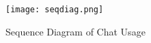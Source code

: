 \begin{figure}
\centering
\texttt{[image: seqdiag.png]}
\caption{Sequence Diagram of Chat Usage}
\label{fig:seq_diag}
\end{figure}



%


%
